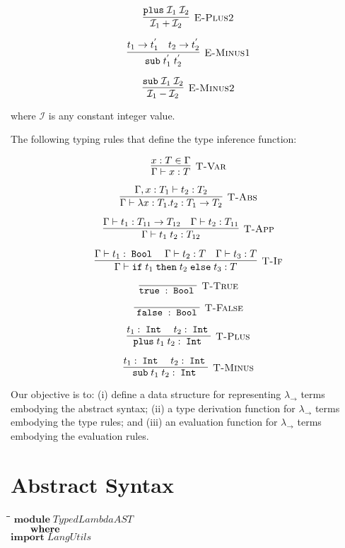 \documentclass[10pt]{article}
\newlength{\lwidth}\setlength{\lwidth}{4.5cm}
\newlength{\cwidth}\setlength{\cwidth}{8mm} %
\newcommand{\Conid}[1]{\mathit{#1}}
\newcommand{\IF}{\ensuremath{\mathtt{ if \;}}}
\newcommand{\THEN}{\ensuremath{\mathtt{\; then \;}}}
\newcommand{\ELSE}{\ensuremath{\mathtt{\; else \;}}}
\newcommand{\TRUE}{\ensuremath{\mathtt{ true \;}}}
\newcommand{\FALSE}{\ensuremath{\mathtt{\; false \;}}}
\newcommand{\BOOL}{\ensuremath{\mathtt{\; Bool \;}}}
\newcommand{\INT}{\ensuremath{\mathtt{\; Int \;}}}
\newcommand{\PLUS}{\ensuremath{\mathtt{ plus \;}}}
\newcommand{\MINUS}{\ensuremath{\mathtt{ sub \;}}}
\begin{document}
\[\vcenter{\infer[\textsc{E-Plus2}]
  {\mathcal{I}_1 + \mathcal{I}_2}
  {\PLUS \mathcal{I}_1\; \mathcal{I}_2}}
\]

\[\vcenter{\infer[\textsc{E-Minus1}]
  {\MINUS t_1^{'}\; t_2^{'}}
  {t_1\rightarrow t_1^{'} & t_2\rightarrow t_2^{'}}}
\]

\[\vcenter{\infer[\textsc{E-Minus2}]
  {\mathcal{I}_1 - \mathcal{I}_2}
  {\MINUS \mathcal{I}_1\; \mathcal{I}_2}}
\]

where $\mathcal{I}$ is any constant integer value.

The following typing rules that define the type inference function:

\[\vcenter{\infer[\textsc{T-Var}]{\Gamma\vdash x:T}{x:T\in\Gamma}}\]

\[\vcenter{\infer[\textsc{T-Abs}]
  {\Gamma\vdash\lambda x:T_1.t_2 : T_1\rightarrow T_2}
  {\Gamma,x:T_1\vdash t_2 : T_2}}
\]

\[\vcenter{\infer[\textsc{T-App}]
  {\Gamma\vdash t_1\; t_2 : T_{12}}
  {\Gamma\vdash t_1 : T_{11}\rightarrow T_{12} & \Gamma\vdash t_2:T_{11}}}
\]

\[\vcenter{\infer[\textsc{T-If}]
  {\Gamma\vdash \IF t_1 \THEN t_2 \ELSE t_3 : T}
  {\Gamma\vdash t_1 : \BOOL & \Gamma\vdash t_2 : T & \Gamma\vdash t_3 : T}}
\]

\[\vcenter{\infer[\textsc{T-True}]{\TRUE:\BOOL}{}}\]

\[\vcenter{\infer[\textsc{T-False}]{\FALSE:\BOOL}{}}\]

\[\vcenter{\infer[\textsc{T-Plus}]
  {\PLUS t_1\; t_2 : \INT}
  {t_1 : \INT & t_2 : \INT}}
\]

\[\vcenter{\infer[\textsc{T-Minus}]
  {\MINUS t_1\; t_2 : \INT}
  {t_1 : \INT & t_2 : \INT}}
\]

Our objective is to: (i) define a data structure for representing
$\lambda_\rightarrow$ terms embodying the abstract syntax; (ii) a type
derivation function for $\lambda_\rightarrow$ terms embodying the type
rules; and (iii) an evaluation function for $\lambda_\rightarrow$
terms embodying the evaluation rules.

\section{Abstract Syntax}

\begin{tabbing}
\qquad\=\hspace{\lwidth}\=\hspace{\cwidth}\=\+\kill
${\mathbf{module}\;\Conid{TypedLambdaAST}}$\\
${\hskip2.00em\relax\mathbf{where}}$\\
${}$\\
${\mathbf{import}\;\Conid{LangUtils}}$
\end{tabbing}
\end{document}
